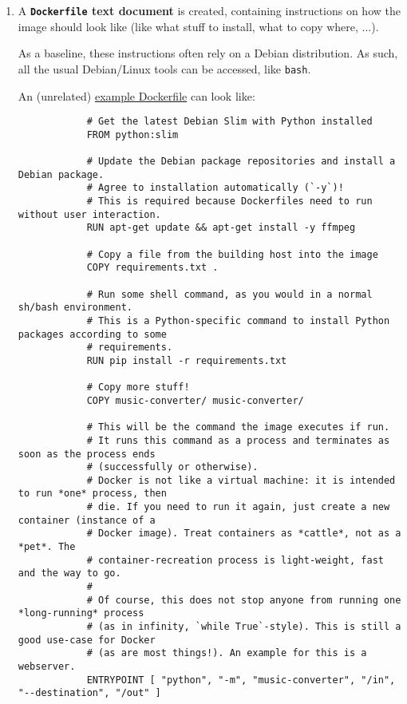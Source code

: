 \begin{enumerate}
    \item A \textbf{\texttt{Dockerfile} text document} is created, containing instructions on how the image should look like (like what stuff to install, what to copy where, ...).

        As a baseline, these instructions often rely on a Debian distribution.
        As such, all the usual Debian/Linux tools can be accessed, like \texttt{bash}.

        An (unrelated)
        \href{https://github.com/alexpovel/random_python/blob/master/music-converter/Dockerfile}{example Dockerfile}
        can look like:

        \begin{verbatim}
            # Get the latest Debian Slim with Python installed
            FROM python:slim

            # Update the Debian package repositories and install a Debian package.
            # Agree to installation automatically (`-y`)!
            # This is required because Dockerfiles need to run without user interaction.
            RUN apt-get update && apt-get install -y ffmpeg

            # Copy a file from the building host into the image
            COPY requirements.txt .

            # Run some shell command, as you would in a normal sh/bash environment.
            # This is a Python-specific command to install Python packages according to some
            # requirements.
            RUN pip install -r requirements.txt

            # Copy more stuff!
            COPY music-converter/ music-converter/

            # This will be the command the image executes if run.
            # It runs this command as a process and terminates as soon as the process ends
            # (successfully or otherwise).
            # Docker is not like a virtual machine: it is intended to run *one* process, then
            # die. If you need to run it again, just create a new container (instance of a
            # Docker image). Treat containers as *cattle*, not as a *pet*. The
            # container-recreation process is light-weight, fast and the way to go.
            #
            # Of course, this does not stop anyone from running one *long-running* process
            # (as in infinity, `while True`-style). This is still a good use-case for Docker
            # (as are most things!). An example for this is a webserver.
            ENTRYPOINT [ "python", "-m", "music-converter", "/in", "--destination", "/out" ]
        \end{verbatim}


\end{enumerate}

